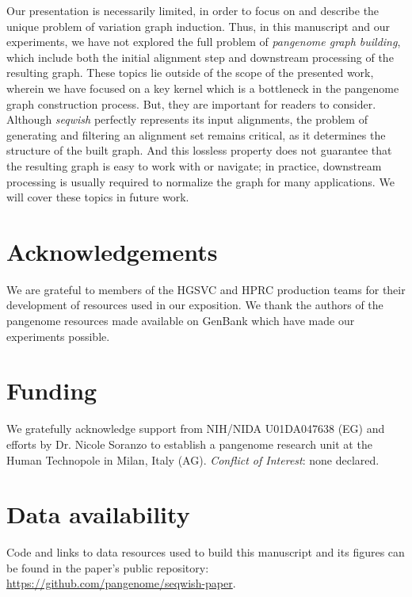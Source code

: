 \documentclass{bioinfo}
\theoremstyle{definition}
\begin{document}
Our presentation is necessarily limited, in order to focus on and describe the unique problem of variation graph induction.
Thus, in this manuscript and our experiments, we have not explored the full problem of \textit{pangenome graph building}, which include both the initial alignment step and downstream processing of the resulting graph.
These topics lie outside of the scope of the presented work, wherein we have focused on a key kernel which is a bottleneck in the pangenome graph construction process.
But, they are important for readers to consider.
Although \textit{seqwish} perfectly represents its input alignments, the problem of generating and filtering an alignment set remains critical, as it determines the structure of the built graph.
And this lossless property does not guarantee that the resulting graph is easy to work with or navigate; in practice, downstream processing is usually required to normalize the graph for many applications.
We will cover these topics in future work.


\section*{Acknowledgements}

We are grateful to members of the HGSVC and HPRC production teams for their development of resources used in our exposition.
We thank the authors of the pangenome resources made available on GenBank which have made our experiments possible.

\section*{Funding}

We gratefully acknowledge support from NIH/NIDA U01DA047638 (EG) and efforts by Dr. Nicole Soranzo to establish a pangenome research unit at the Human Technopole in Milan, Italy (AG).
\linebreak
\linebreak
\textit{Conflict of Interest}: none declared.

\section*{Data availability}

Code and links to data resources used to build this manuscript and its figures can be found in the paper's public repository: \url{https://github.com/pangenome/seqwish-paper}.




\end{document}

